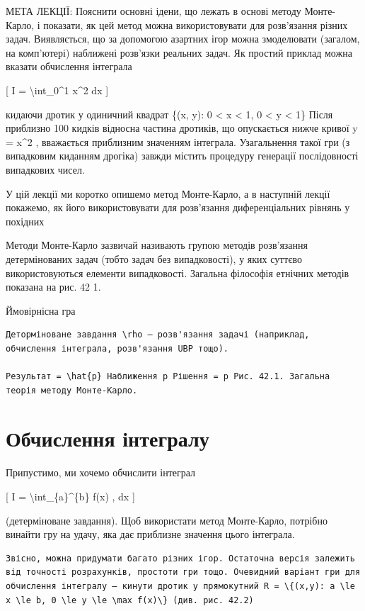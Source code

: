 \documentclass[
]{article}
\begin{document}
МЕТА ЛЕКЦІЇ: Пояснити основні ідени, що лежать в основі методу
Монте-Карло, і показати, як цей метод можна використовувати для
розв'язання різних задач. Виявляється, що за допомогою азартних ігор
можна змоделювати (загалом, на комп'ютері) наближені розв'язки реальних
задач. Як простий приклад можна вказати обчислення інтеграла

{[} I = \textbackslash int\_0\^{}1 x\^{}2 dx {]}

кидаючи дротик у одиничний квадрат \{(x, y): 0 \textless{} x \textless{}
1, 0 \textless{} y \textless{} 1\} Після приблизно 100 кидків відносна
частина дротиків, що опускається нижче кривої y = x\^{}2 , вважається
приблизним значенням інтеграла. Узагальнення такої гри (з випадковим
киданням дрогіка) завжди містить процедуру генерації послідовності
випадкових чисел.

У цій лекції ми коротко опишемо метод Монте-Карло, а в наступній лекції
покажемо, як його використовувати для розв'язання диференціальних
рівнянь у похідних

Методи Монте-Карло зазвичай називають групою методів розв'язання
детермінованих задач (тобто задач без випадковості), у яких суттєво
використовуються елементи випадковості. Загальна філософія етнічних
методів показана на рис. 42 1.

Ймовірнісна гра

\begin{verbatim}
Деторміноване завдання \rho — розв'язання задачі (наприклад, обчислення інтеграла, розв'язання UBP тощо).

Результат = \hat{p} Наближення p Рішення = p Рис. 42.1. Загальна теорія методу Монте-Карло.
\end{verbatim}

\section{Обчислення
інтегралу}\label{ux43eux431ux447ux438ux441ux43bux435ux43dux43dux44f-ux456ux43dux442ux435ux433ux440ux430ux43bux443}

Припустимо, ми хочемо обчислити інтеграл

{[} I = \textbackslash int\_\{a\}\^{}\{b\} f(x) , dx {]}

(детерміноване завдання). Щоб використати метод Монте-Карло, потрібно
винайти гру на удачу, яка дає приблизне значення цього інтеграла.

\begin{verbatim}
Звісно, можна придумати багато різних ігор. Остаточна версія залежить від точності розрахунків, простоти гри тощо. Очевидний варіант гри для обчислення інтегралу — кинути дротик у прямокутний R = \{(x,y): a \le x \le b, 0 \le y \le \max f(x)\} (див. рис. 42.2)
\end{verbatim}
\end{document}
